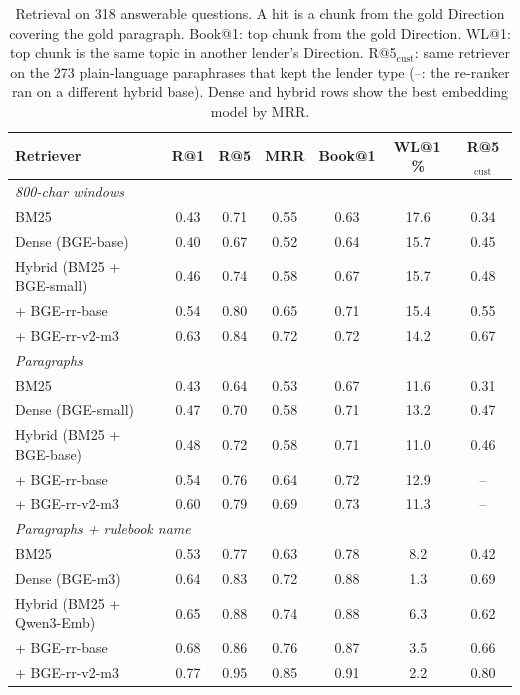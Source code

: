\begin{table}[t]\centering\small\setlength{\tabcolsep}{3pt}
\begin{tabular}{lcccccc}\toprule
Retriever & R@1 & R@5 & MRR & Book@1 & WL@1\,\% & R@5$_{\text{cust}}$\\\midrule
\multicolumn{7}{l}{\textit{800-char windows}}\\
BM25 & 0.43 & 0.71 & 0.55 & 0.63 & 17.6 & 0.34 \\
Dense (BGE-base) & 0.40 & 0.67 & 0.52 & 0.64 & 15.7 & 0.45 \\
Hybrid (BM25 + BGE-small) & 0.46 & 0.74 & 0.58 & 0.67 & 15.7 & 0.48 \\
+ BGE-rr-base & 0.54 & 0.80 & 0.65 & 0.71 & 15.4 & 0.55 \\
+ BGE-rr-v2-m3 & 0.63 & 0.84 & 0.72 & 0.72 & 14.2 & 0.67 \\
\midrule
\multicolumn{7}{l}{\textit{Paragraphs}}\\
BM25 & 0.43 & 0.64 & 0.53 & 0.67 & 11.6 & 0.31 \\
Dense (BGE-small) & 0.47 & 0.70 & 0.58 & 0.71 & 13.2 & 0.47 \\
Hybrid (BM25 + BGE-base) & 0.48 & 0.72 & 0.58 & 0.71 & 11.0 & 0.46 \\
+ BGE-rr-base & 0.54 & 0.76 & 0.64 & 0.72 & 12.9 & -- \\
+ BGE-rr-v2-m3 & 0.60 & 0.79 & 0.69 & 0.73 & 11.3 & -- \\
\midrule
\multicolumn{7}{l}{\textit{Paragraphs + rulebook name}}\\
BM25 & 0.53 & 0.77 & 0.63 & 0.78 & 8.2 & 0.42 \\
Dense (BGE-m3) & 0.64 & 0.83 & 0.72 & 0.88 & 1.3 & 0.69 \\
Hybrid (BM25 + Qwen3-Emb) & 0.65 & 0.88 & 0.74 & 0.88 & 6.3 & 0.62 \\
+ BGE-rr-base & 0.68 & 0.86 & 0.76 & 0.87 & 3.5 & 0.66 \\
+ BGE-rr-v2-m3 & 0.77 & 0.95 & 0.85 & 0.91 & 2.2 & 0.80 \\
\bottomrule\end{tabular}
\caption{Retrieval on 318 answerable questions. A hit is a chunk from the gold Direction covering the gold paragraph. Book@1: top chunk from the gold Direction. WL@1: top chunk is the same topic in another lender's Direction. R@5$_{\text{cust}}$: same retriever on the 273 plain-language paraphrases that kept the lender type (--: the re-ranker ran on a different hybrid base). Dense and hybrid rows show the best embedding model by MRR.}\label{tab:retrieval}
\end{table}
